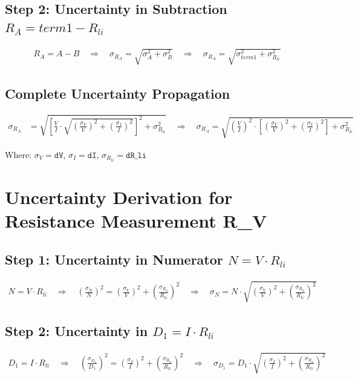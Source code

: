 \documentclass{article} %
\begin{document}
\subsection*{Step 2: Uncertainty in Subtraction $R_A = term1 - R_{li}$}
\begin{align*}
R_A = A - B \quad \Rightarrow \quad \sigma_{R_A} = \sqrt{\sigma_A^2 + \sigma_B^2} \quad \Rightarrow \quad \sigma_{R_A} = \sqrt{\sigma_{term1}^2 + \sigma_{R_{li}}^2}
\end{align*}

\subsection*{Complete Uncertainty Propagation}
\begin{align*}
\sigma_{R_A} &= \sqrt{\left[\frac{V}{I} \cdot \sqrt{\left(\frac{\sigma_V}{V}\right)^2 + \left(\frac{\sigma_I}{I}\right)^2}\right]^2 + \sigma_{R_{li}}^2} \quad \Rightarrow \quad \sigma_{R_A} = \sqrt{\left(\frac{V}{I}\right)^2 \cdot \left[\left(\frac{\sigma_V}{V}\right)^2 + \left(\frac{\sigma_I}{I}\right)^2\right] + \sigma_{R_{li}}^2}
\end{align*}

Where: $\sigma_V = \texttt{dV}$, $\sigma_I = \texttt{dI}$, $\sigma_{R_{li}} = \texttt{dR\_li}$


\newpage

\section{Uncertainty Derivation for Resistance Measurement R\_V}
\label{app:b_RV_uncertainty}

\subsection*{Step 1: Uncertainty in Numerator $N = V \cdot R_{li}$}
\begin{align*}
N = V \cdot R_{li} \quad \Rightarrow \quad \left(\frac{\sigma_N}{N}\right)^2 = \left(\frac{\sigma_V}{V}\right)^2 + \left(\frac{\sigma_{R_{li}}}{R_{li}}\right)^2 \quad \Rightarrow \quad \sigma_N = N \cdot \sqrt{\left(\frac{\sigma_V}{V}\right)^2 + \left(\frac{\sigma_{R_{li}}}{R_{li}}\right)^2}
\end{align*}

\subsection*{Step 2: Uncertainty in $D_1 = I \cdot R_{li}$}
\begin{align*}
D_1 = I \cdot R_{li} \quad \Rightarrow \quad \left(\frac{\sigma_{D_1}}{D_1}\right)^2 = \left(\frac{\sigma_I}{I}\right)^2 + \left(\frac{\sigma_{R_{li}}}{R_{li}}\right)^2 \quad \Rightarrow \quad \sigma_{D_1} = D_1 \cdot \sqrt{\left(\frac{\sigma_I}{I}\right)^2 + \left(\frac{\sigma_{R_{li}}}{R_{li}}\right)^2}
\end{align*}
\end{document}
